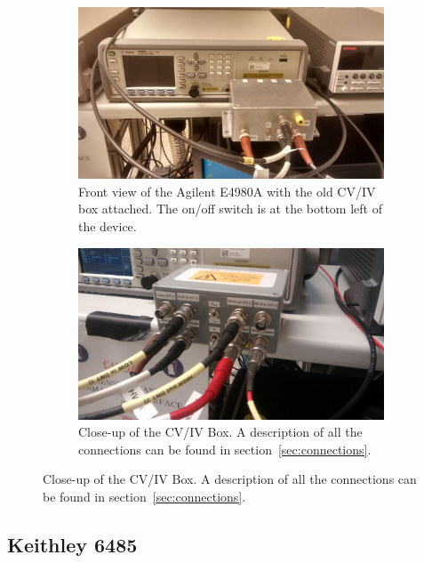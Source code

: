\documentclass[a4paper]{article}
\begin{document}
\begin{figure}[hbtp]
\centering
\begin{subfigure}[t]{0.475\textwidth}
\centering\captionsetup{width=.8\linewidth}%
\includegraphics[width=\linewidth]{pictures/front_agilent.jpg}
\caption[Front View of the Agilent E4980A]{Front view of the Agilent E4980A with the old CV/IV box attached. The on/off switch is at the bottom left of the device.}
\label{fig:agilent}
\end{subfigure}
\begin{subfigure}[t]{0.475\textwidth}
\centering\captionsetup{width=.8\linewidth}%
\includegraphics[width=\linewidth]{pictures/cvivswitch2.jpg}
\caption[The CV/IV Box]{Close-up of the CV/IV Box. A description of all the connections can be found in section~\ref{sec:connections}.}
\label{fig:cvivbox}
\end{subfigure}
\end{figure}

\subsection{Keithley 6485}
\label{sec:keithley6485}
\end{document}
